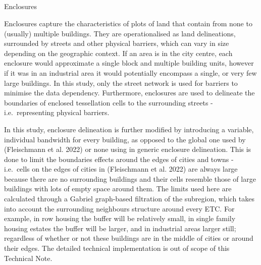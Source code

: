 \documentclass[
  letterpaper,
  DIV=11,
  numbers=noendperiod]{scrartcl}
\makeatletter
\let\oldsubparagraph\subparagraph
\renewcommand{\subparagraph}{
    \@ifstar
      \xxxSubParagraphStar
      \xxxSubParagraphNoStar
  }
\newcommand{\xxxSubParagraphStar}[1]{\oldsubparagraph*{#1}\mbox{}}
\newcommand{\xxxSubParagraphNoStar}[1]{\oldsubparagraph{#1}\mbox{}}
\makeatother
\begin{document}
\subparagraph{Enclosures}\label{enclosures}

Enclosures capture the characteristics of plots of land that contain
from none to (usually) multiple buildings. They are operationalised as
land delineations, surrounded by streets and other physical barriers,
which can vary in size depending on the geographic context. If an area
is in the city centre, each enclosure would approximate a single block
and multiple building units, however if it was in an industrial area it
would potentially encompass a single, or very few large buildings. In
this study, only the street network is used for barriers to minimise the
data dependency. Furthermore, enclosures are used to delineate the
boundaries of enclosed tessellation cells to the surrounding streets -
i.e.~representing physical barriers.

In this study, enclosure delineation is further modified by introducing
a variable, individual bandwidth for every building, as opposed to the
global one used by (Fleischmann et al. 2022) or none using in generic
enclosure delineation. This is done to limit the boundaries effects
around the edges of cities and towns - i.e.~cells on the edges of cities
in (Fleischmann et al. 2022) are always large because there are no
surrounding buildings and their cells resemble those of large buildings
with lots of empty space around them. The limits used here are
calculated through a Gabriel graph-based filtration of the subregion,
which takes into account the surrounding neighbours structure around
every ETC. For example, in row housing the buffer will be relatively
small, in single family housing estates the buffer will be larger, and
in industrial areas larger still; regardless of whether or not these
buildings are in the middle of cities or around their edges. The
detailed technical implementation is out of scope of this Technical
Note.
\end{document}
